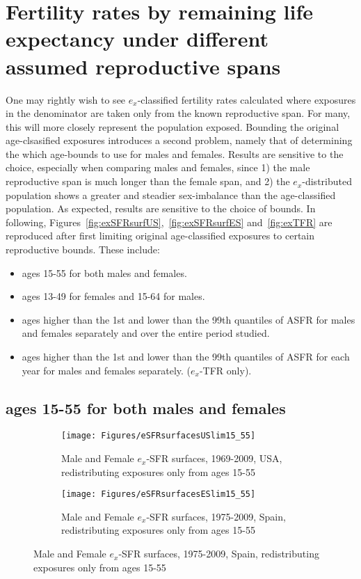 % 

\section{Fertility rates by remaining life expectancy under different assumed
reproductive spans}

One may rightly wish to see $e_x$-classified fertility rates calculated where
exposures in the denominator are taken only from the known reproductive span.
For many, this will more closely represent the population exposed. Bounding the
original age-clsasified exposures introduces a second problem, namely that of
determining the which age-bounds to use for males and females. Results are
sensitive to the choice, especially when comparing males and females, since 1)
the male reproductive span is much longer than the female span, and 2) the
$e_x$-distributed population shows a greater and steadier sex-imbalance than the
age-classified population. As expected, results are sensitive to the choice of
bounds. In following, Figures~\ref{fig:exSFRsurfUS},~\ref{fig:exSFRsurfES}
and~\ref{fig:exTFR} are reproduced after first limiting original
age-classified exposures to certain reproductive bounds. These include:

\begin{itemize}
  \item ages 15-55 for both males and females.
  \item ages 13-49 for females and 15-64 for males.
  \item ages higher than the 1st and lower than the 99th quantiles of ASFR for
  males and females separately and over the entire period studied.
  \item ages higher than the 1st and lower than the 99th quantiles of ASFR for
  each year for males and females separately. ($e_x$-TFR only).
\end{itemize}

\subsection{ages 15-55 for both males and females}

\begin{figure}
        \centering
        \begin{subfigure}
                \centering
                \caption{Male and Female $e_x$-SFR surfaces, 1969-2009, USA,
                redistributing exposures only from ages 15-55}
                \texttt{[image: Figures/eSFRsurfacesUSlim15\_55]}
                \label{fig:exSFRsurfUSlim15_55}
        \end{subfigure}
        \begin{subfigure}
                \centering
                \caption{Male and Female $e_x$-SFR surfaces, 1975-2009, Spain,
                redistributing exposures only from ages 15-55}
                \texttt{[image: Figures/eSFRsurfacesESlim15\_55]} 
                \label{fig:exSFRsurfESlim15_55}
        \end{subfigure}
\end{figure}

